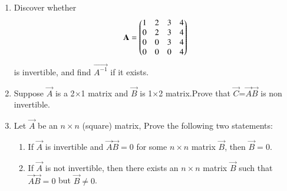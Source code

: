 \renewcommand{\theequation}{\theenumi}
\renewcommand{\thefigure}{\theenumi}
\begin{enumerate}[label=\thesubsection.\arabic*.,ref=\thesubsection.\theenumi]
%
\item Discover whether
\begin{align}
	\mathbf{A}=\begin{pmatrix} 1 & 2 & 3 & 4 \\
			0 & 2 & 3 & 4 \\
			0 & 0 & 3 & 4 \\
			0 & 0 & 0 & 4\end{pmatrix}
\end{align}
is invertible, and find $\vec{A^{-1}}$ if it exists.
\\
%
\solution

%
\item Suppose $\vec{A}$ is a 2$\times$1  matrix and $\vec{B}$ is 1$\times$2 matrix.Prove that $\vec{C}$=$\vec{A}$$\vec{B}$ is non invertible.

\solution

\item Let $\vec{A}$ be an $n \times n$ (square) matrix, Prove the following two statements:
 \begin{enumerate}
   \item If $\vec{A}$ is invertible and $\vec{A}\vec{B}=0$ for some $n \times n$ matrix $\vec{B}$, then $\vec{B}=0$.
   \item If $\vec{A}$ is not invertible, then there exists an $n \times n$ matrix $\vec{B}$ such that $\vec{A}\vec{B}=0$ but $\vec{B} \not= 0$.
 \end{enumerate}
%
\solution

\end{enumerate}


